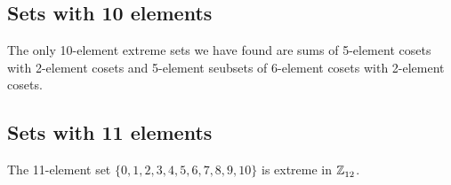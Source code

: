\subsection{Sets with 10 elements}
The only 10-element extreme sets we have found are sums of 5-element cosets with 2-element cosets and 5-element seubsets of
6-element cosets with 2-element cosets.


 \subsection{Sets with 11 elements}
 
\begin{prop}\label{prop11inZ12}
The 11-element set $\{0,  1,  2,  3,  4,  5,  6,  7,  8,  9,  10 \}$ is extreme in $\texttt{$\mathbb Z_{12}^{\,}$}$. 
\newline \end{prop} 


